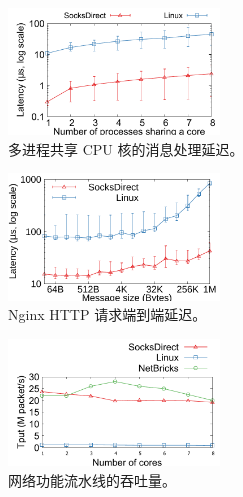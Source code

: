 \begin{figure}[t!]
		
		\centering \includegraphics[width=0.5\textwidth]{eval/microbenchmark/sharecore-lat.pdf}
		
		\caption{多进程共享 CPU 核的消息处理延迟。}
		\label{socksdirect:fig:eval-context-switch}
\end{figure}
\begin{figure}[t!]
				\centering \includegraphics[width=0.5\textwidth]{eval/web/msgsize-clocal-lat.pdf}
		
		\caption{Nginx HTTP 请求端到端延迟。}
		\label{socksdirect:fig:eval-nginx}
\end{figure}
\begin{figure}[t!]
		\centering
		\includegraphics[width=0.5\textwidth]{eval/microbenchmark/nfv-tun-tput.pdf}
		
		\caption{网络功能流水线的吞吐量。}
		\label{socksdirect:fig:eval-tun-tput}
		
		
\end{figure}


